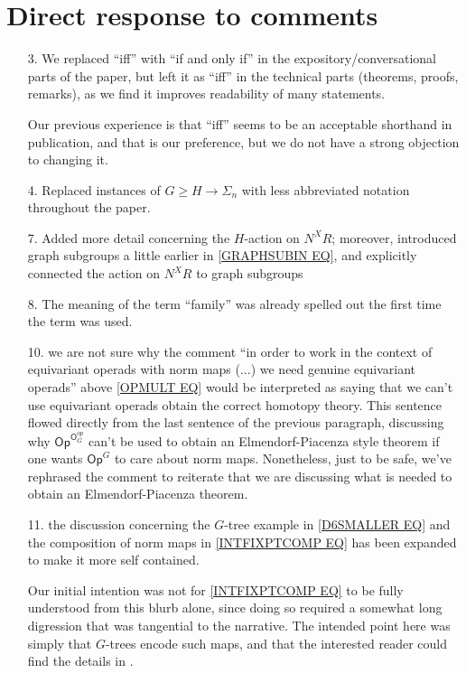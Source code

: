 \documentclass{article}
\begin{document}
\section{Direct response to comments}

\begin{itemize}
	\item[3.] We replaced ``iff'' with ``if and only if''
	in the expository/conversational parts of the paper, 
	but left it as ``iff'' in the technical parts (theorems, proofs, remarks), as we find it improves readability of many statements.
	
	Our previous experience is that ``iff'' seems to be an acceptable shorthand in publication, and that is our preference,
	but we do not have a strong objection to changing it.


        \item[4.] Replaced instances of $G \geq H \to \Sigma_n$ with less abbreviated notation throughout the paper.
        
      
	\item[7.] Added more detail concerning the 
	$H$-action on $N^X R$;
	moreover, introduced graph subgroups a little earlier in
	\eqref{GRAPHSUBIN EQ},
	and explicitly connected the action on 
	$N^X R$ to graph subgroups
	
	\item[8.] The meaning of the term ``family''
	was already spelled out the first time the term was used.

	\item[10.] we are not sure why the comment 
	``in order to work in the context of equivariant operads with norm maps (...) we need genuine equivariant operads''
	above \eqref{OPMULT EQ}
	would be interpreted as saying that we can't use equivariant operads obtain the correct homotopy theory.
	This sentence flowed directly from the last sentence of the previous paragraph, discussing why
	$\mathsf{Op}^{\mathsf{O}_G^{op}}$
	can't be used to obtain an Elmendorf-Piacenza style theorem if one wants $\mathsf{Op}^G$ to care about norm maps.
	Nonetheless, just to be safe, we've rephrased the comment to reiterate that we are discussing what is needed to obtain
	an Elmendorf-Piacenza theorem.
	
	\item[11.] the discussion concerning 
	the $G$-tree example in
	\eqref{D6SMALLER EQ}
	and 
	the composition of norm maps in
	\eqref{INTFIXPTCOMP EQ}
	has been expanded to make it more self contained.
	
	Our initial intention was not for
	\eqref{INTFIXPTCOMP EQ}
	to be fully understood from this blurb alone,
	since doing so required a somewhat long digression 
	that was tangential to the narrative.
	The intended point here
	was simply that $G$-trees encode such maps,
	and that the interested reader could find the details in \cite[\S 4]{Pe17}.
	

\end{itemize}
\end{document}
